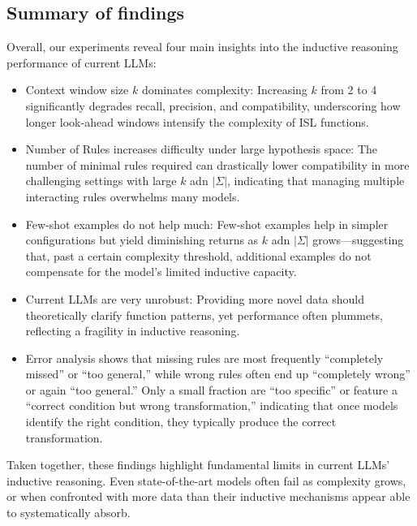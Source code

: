 \subsection{Summary of findings}
Overall, our experiments reveal four main insights into the inductive reasoning performance of current LLMs:
\begin{itemize}
    \item Context window size $k$ dominates complexity: Increasing $k$ from 2 to 4 significantly degrades recall, precision, and compatibility, underscoring how longer look-ahead windows intensify the complexity of ISL functions. 
    \item Number of Rules increases difficulty under large hypothesis space: The number of minimal rules required can drastically lower compatibility in more challenging settings with large $k$ adn $|\Sigma|$, indicating that managing multiple interacting rules overwhelms many models.
    \item Few-shot examples do not help much: Few-shot examples help in simpler configurations but yield diminishing returns as $k$ adn $|\Sigma|$ grows—suggesting that, past a certain complexity threshold, additional examples do not compensate for the model's limited inductive capacity.
    \item Current LLMs are very unrobust: Providing more novel data should theoretically clarify function patterns, yet performance often plummets, reflecting a fragility in inductive reasoning.
    \item Error analysis shows that missing rules are most frequently ``completely missed'' or ``too general,'' while wrong rules often end up ``completely wrong'' or again ``too general.'' Only a small fraction are ``too specific'' or feature a ``correct condition but wrong transformation,'' indicating that once models identify the right condition, they typically produce the correct transformation.
\end{itemize}

Taken together, these findings highlight fundamental limits in current LLMs' inductive reasoning. Even state-of-the-art models often fail as complexity grows, or when confronted with more data than their inductive mechanisms appear able to systematically absorb.



